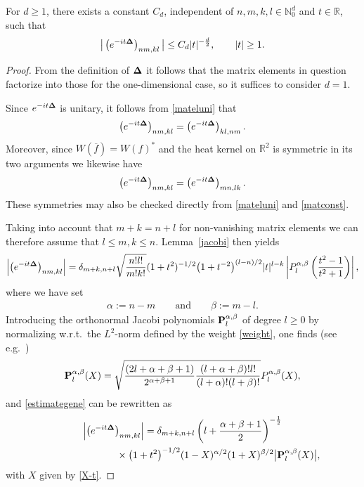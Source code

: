 \begin{lemma}
\label{Uniest1}
For $d\geq 1$, there exists a constant $C_d$, independent of $n,m,k,l
\in\mathbb N_0^d$ and
$t\in\mathbb R$, such that
\begin{gather}\label{decay0}
\big|\left(e^{-it{\bf\Delta}}\right)_{nm,kl}\big| \leq  C_d |t|^{-\frac
d2} ,\qquad |t|\geq 1 .
\end{gather}
\end{lemma}

\begin{proof} From the def\/inition of ${\bf\Delta}$ it follows that the
  matrix elements in question factorize into those for the
  one-dimensional case, so it suf\/f\/ices to consider $d=1$.

 Since $e^{-it{\bf\Delta}}$ is unitary, it follows from
  \eqref{mateluni} that
 \[
\left(e^{-it{\bf\Delta}}\right)_{nm,kl} =  \left(e^{-it{\bf\Delta}}\right)_{kl,nm}.
\]
 Moreover, since
$W(\overline f)=W(f)^*$ and the heat kernel on $\mathbb R^2$ is
symmetric in its two arguments we likewise have
 \[
\left(e^{-it{\bf\Delta}}\right)_{nm,kl} =  \left(e^{-it{\bf\Delta}}\right)_{mn,lk} .
\]
These symmetries may also be checked directly from \eqref{mateluni} and \eqref{matconst}.

Taking into account that $m+k=n+l$ for non-vanishing matrix elements
we can therefore assume that $l\leq m,k\leq n$. Lemma~\ref{jacobi} then yields
\begin{gather}
\label{estimategene}
\left|\left(e^{-it{\bf\Delta}}\right)_{nm,kl}\right|
 = \delta_{m+k,n+l}
\sqrt{\frac{n! l!}{m! k!}}(1+t^2)^{-1/2}
\big(1+t^{-2}\big)^{(l-n)/2}|t|^{l-k}
\left|P_l^{\alpha,\beta}\left(\frac{t^2-1}{t^2+1}\right)\right|,
\end{gather}
where we have set
\begin{gather*}%
\alpha:=n-m \qquad\mbox{and}\qquad \beta:=m-l .
\end{gather*}
Introducing the orthonormal Jacobi polynomials ${\bf
  P}_l^{\alpha,\beta}$ of degree $l\geq 0$ by normalizing w.r.t.\ the
$L^2$-norm def\/ined by the weight \eqref{weight}, one f\/inds (see e.g.~\cite[p.~67]{Szego})
\[
{\bf P}_l^{\alpha,\beta}(X)  =  \sqrt{\frac{(2l+\alpha +\beta +1)}{2^{\alpha
    +\beta +1}}\frac{(l+\alpha +\beta)! l!}{(l+\alpha)! (l+\beta)!}}
P_l^{\alpha,\beta}(X) ,
\]
and \eqref{estimategene} can be rewritten as
\begin{gather}
\left|\left(e^{-it{\bf\Delta}}\right)_{nm,kl}\right|
 = \delta_{m+k,n+l}\left(l+\frac{\alpha +\beta +1}2\right)^{-\frac 12}\nonumber\\
 \hphantom{\left|\left(e^{-it{\bf\Delta}}\right)_{nm,kl}\right|=}{}\times
\big(1+t^2\big)^{-1/2} (1-X)^{\alpha/2}(1+X)^{\beta/2}
\big|{\bf P}_l^{\alpha,\beta}(X)\big| ,\label{estimategene2}
\end{gather}
with $X$ given by \eqref{X-t}.


\end{proof}
